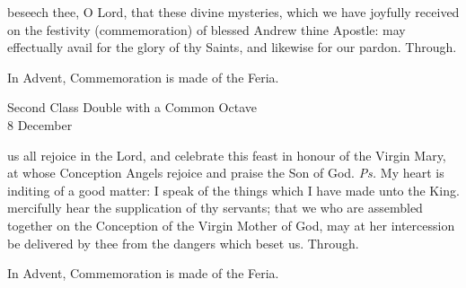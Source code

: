 \postcommunion
{} beseech thee, O Lord, that these divine mysteries, which we have joyfully received on the festivity (commemoration) of blessed Andrew thine Apostle: may effectually avail for the glory of thy Saints, and likewise for our pardon. Through.
\begin{rubric}
    In Advent, Commemoration is made of the Feria.
\end{rubric}

\begin{inhead}
    {Second Class Double with a Common Octave\\
8 December}
\end{inhead}

\introit
{} us all rejoice in the Lord, and celebrate this feast in honour of the Virgin Mary, at whose Conception Angels rejoice and praise the Son of God. \textit{Ps.} My heart is inditing of a good matter: I speak of the things which I have made unto the King.
\collect
{} mercifully hear the supplication of thy servants; that we who are assembled together on the Conception of the Virgin Mother of God, may at her intercession be delivered by thee from the dangers which beset us. Through.
\begin{rubric}
    In Advent, Commemoration is made of the Feria.
\end{rubric}

